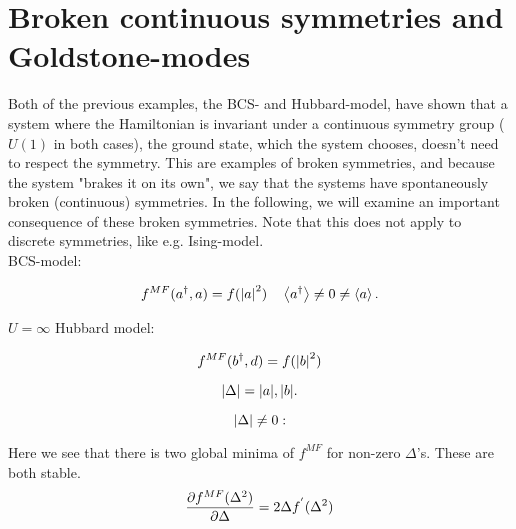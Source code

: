 \section{Broken continuous symmetries and Goldstone-modes}

Both of the previous examples, the BCS- and Hubbard-model, have shown that a system where the Hamiltonian is invariant under a continuous symmetry group ($U(1)$ in both cases), the ground state, which the system chooses, doesn't need to respect the symmetry. This are examples of broken symmetries, and because the system "brakes it on its own", we say that the systems have spontaneously broken (continuous) symmetries. In the following, we will examine an important consequence of these broken symmetries. Note that this does not apply to discrete symmetries, like e.g. Ising-model. \\ 

BCS-model: 

\begin{equation*}
    f^{MF}(a^{\dagger}, a) = f(\abs{a}^2) \quad \expval{a^{\dagger}} \neq 0 \neq \expval{a}.
\end{equation*}

$U = \infty$ Hubbard model: 

\begin{equation*}
    f^{MF}(b^{\dagger}, d) = f(\abs{b}^2) 
\end{equation*}

\begin{equation*}
    \abs{\Delta} = \abs{a}, \abs{b}. 
\end{equation*}

\begin{equation*}
    \abs{\Delta} \neq 0:
\end{equation*}


Here we see that there is two global minima of $f^{MF}$ for non-zero $\Delta$'s. These are both stable. \\

\begin{equation*}
    \pdv{f^{MF}(\Delta^2)}{\Delta} = 2\Delta f^{'}(\Delta^2) 
\end{equation*}

